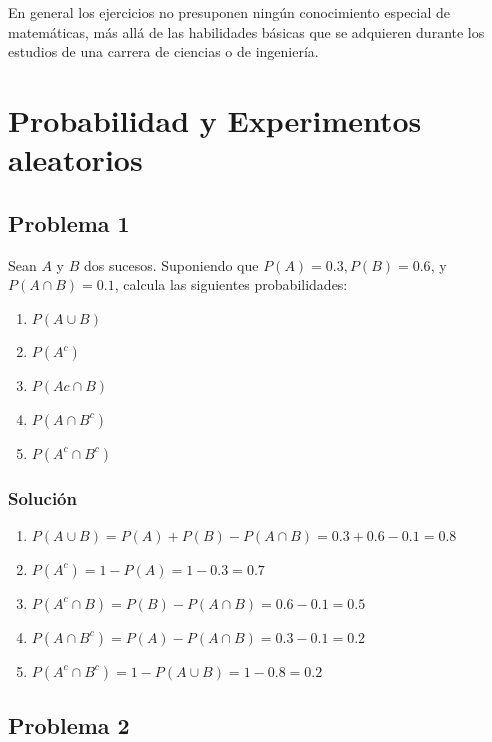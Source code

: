 \documentclass[
]{article}
\providecommand{\tightlist}{%
  \setlength{\itemsep}{0pt}\setlength{\parskip}{0pt}}
\begin{document}
En general los ejercicios no presuponen ningún conocimiento especial de matemáticas, más allá de las habilidades básicas que se adquieren durante los estudios de una carrera de ciencias o de ingeniería.

\section{Probabilidad y Experimentos aleatorios}\label{probabilidad-y-experimentos-aleatorios}

\subsection{Problema 1}\label{problema-1}

Sean \(A\) y \(B\) dos sucesos. Suponiendo que \(P(A)=0.3, P(B)=0.6\), y \(P(A \cap B)=0.1\), calcula las siguientes probabilidades:

\begin{enumerate}
\def\labelenumi{\alph{enumi})}
\item
  \(P(A \cup B)\)
\item
  \(P(A^c)\)
\item
  \(P(A c \cap B)\)
\item
  \(P(A \cap B^c)\)
\item
  \(P(A^c \cap B^c)\)
\end{enumerate}

\subsubsection{Solución}\label{soluciuxf3n}

\begin{enumerate}
\def\labelenumi{\alph{enumi}.}
\tightlist
\item
  \(P(A \cup B)=P(A)+P(B)-P(A \cap B)=0.3+0.6-0.1=0.8\)
\item
  \(P\left(A^{c}\right)=1-P(A)=1-0.3=0.7\)
\item
  \(P\left(A^{c} \cap B\right)=P(B)-P(A \cap B)=0.6-0.1=0.5\)
\item
  \(P\left(A \cap B^{c}\right)=P(A)-P(A \cap B)=0.3-0.1=0.2\)
\item
  \(P\left(A^{c} \cap B^{c}\right)=1-P(A \cup B)=1-0.8=0.2\)
\end{enumerate}

\subsection{Problema 2}\label{problema-2}
\end{document}
